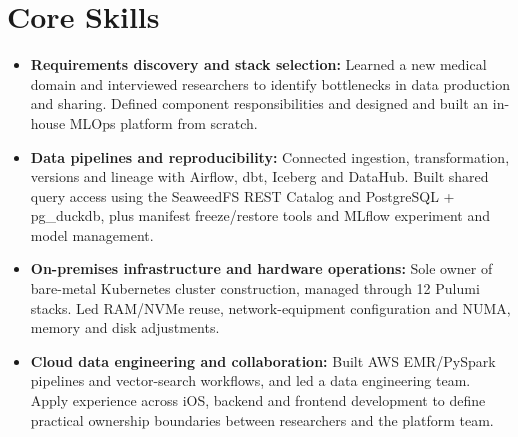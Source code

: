 \section{Core Skills}
\begin{itemize}[leftmargin=0.15in, label={}]
\item{\textbf{Requirements discovery and stack selection:} Learned a new medical domain and interviewed researchers to identify bottlenecks in data production and sharing. Defined component responsibilities and designed and built an in-house MLOps platform from scratch.}
\item{\textbf{Data pipelines and reproducibility:} Connected ingestion, transformation, versions and lineage with Airflow, dbt, Iceberg and DataHub. Built shared query access using the SeaweedFS REST Catalog and PostgreSQL + pg\_duckdb, plus manifest freeze/restore tools and MLflow experiment and model management.}
\item{\textbf{On-premises infrastructure and hardware operations:} Sole owner of bare-metal Kubernetes cluster construction, managed through 12 Pulumi stacks. Led RAM/NVMe reuse, network-equipment configuration and NUMA, memory and disk adjustments.}
\item{\textbf{Cloud data engineering and collaboration:} Built AWS EMR/PySpark pipelines and vector-search workflows, and led a data engineering team. Apply experience across iOS, backend and frontend development to define practical ownership boundaries between researchers and the platform team.}
\end{itemize}
